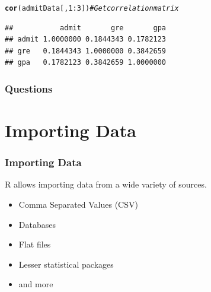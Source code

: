 \documentclass{beamer}\usepackage[]{graphicx}\usepackage[]{color}
\makeatletter
\newcommand{\hlnum}[1]{\textcolor[rgb]{0.686,0.059,0.569}{#1}}%
\newcommand{\hlcom}[1]{\textcolor[rgb]{0.678,0.584,0.686}{\textit{#1}}}%
\newcommand{\hlopt}[1]{\textcolor[rgb]{0,0,0}{#1}}%
\newcommand{\hlstd}[1]{\textcolor[rgb]{0.345,0.345,0.345}{#1}}%
\newcommand{\hlkwd}[1]{\textcolor[rgb]{0.737,0.353,0.396}{\textbf{#1}}}%
\newenvironment{kframe}{%
 \def\at@end@of@kframe{}%
 \ifinner\ifhmode%
  \def\at@end@of@kframe{\end{minipage}}%
  \begin{minipage}{\columnwidth}%
 \fi\fi%
 \def\FrameCommand##1{\hskip\@totalleftmargin \hskip-\fboxsep
 \colorbox{shadecolor}{##1}\hskip-\fboxsep
     \hskip-\linewidth \hskip-\@totalleftmargin \hskip\columnwidth}%
 \MakeFramed {\advance\hsize-\width
   \@totalleftmargin\z@ \linewidth\hsize
   \@setminipage}}%
 {\par\unskip\endMakeFramed%
 \at@end@of@kframe}
\newenvironment{knitrout}{}{} %
\makeatother
\begin{document}
\begin{frame}
\begin{knitrout}\scriptsize
{}\color{fgcolor}\begin{kframe}
\begin{alltt}
\hlkwd{cor}\hlstd{(admitData[,} \hlnum{1}\hlopt{:}\hlnum{3}\hlstd{])}  \hlcom{# Get correlation matrix}
\end{alltt}
\begin{verbatim}
##           admit       gre       gpa
## admit 1.0000000 0.1844343 0.1782123
## gre   0.1844343 1.0000000 0.3842659
## gpa   0.1782123 0.3842659 1.0000000
\end{verbatim}
\end{kframe}
\end{knitrout}

\end{frame}


\begin{frame}
	\frametitle{Questions}
	\begin{center}
		\vfill
		\vfill
	\end{center}
\end{frame}


\section{Importing Data}

\begin{frame}
\frametitle{Importing Data}

R allows importing data from a wide variety of sources. \vspace{1em}

\begin{itemize}
\item Comma Separated Values (CSV)
\item Databases
\item Flat files
\item Lesser statistical packages
\item and more
\end{itemize}

\end{frame}
\end{document}
